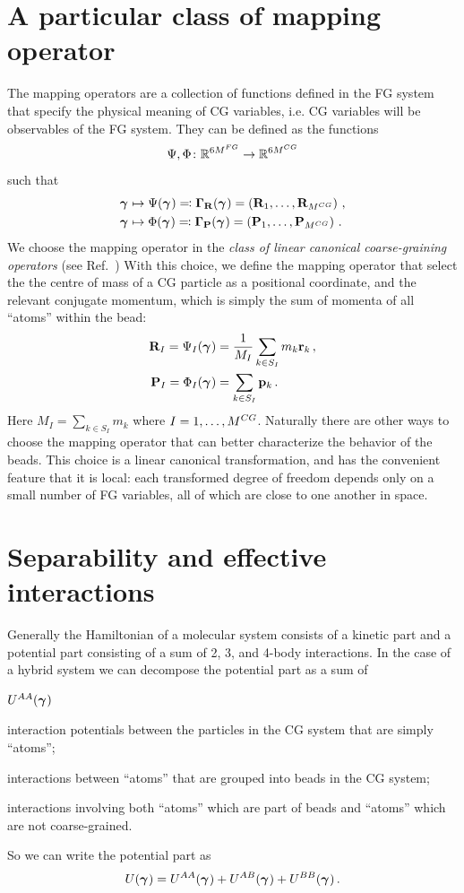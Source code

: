 \documentclass[10pt,a4paper]{book}
\theoremstyle{definition}
\begin{document}
\section{A particular class of mapping operator}
\label{Sec:Mapping}
The mapping operators are a collection of functions defined in the FG system that specify the physical meaning of CG variables, i.e. CG variables will be observables of the FG system. They can be defined as the functions
$$\Psi,\Phi\colon  \mathbb{R}^{6M^{FG}}  \to  \mathbb{R}^{6M^{CG}}$$ such that 
\begin{align*}
\boldsymbol\gamma_{}  &\mapsto \Psi(\boldsymbol\gamma_{}) \eqqcolon \boldsymbol\Gamma_{\mathbf{R}}(\boldsymbol\gamma_{})=\left(\mathbf{R}_1,\ldots,\mathbf{R}_{M^{CG}}\right)\,,\\
\boldsymbol\gamma_{}  &\mapsto \Phi(\boldsymbol\gamma_{}) \eqqcolon \boldsymbol\Gamma_{\mathbf{P}}(\boldsymbol\gamma_{})=\left(\mathbf{P}_1,\ldots,\mathbf{P}_{M^{CG}}\right)\,.
\end{align*}
We choose the mapping operator in the \emph{class of linear canonical coarse-graining operators} (see Ref.~\cite{DiPasquale2019}) With this choice, we define the mapping operator that select the the centre of mass of a CG particle as a positional coordinate, and the relevant conjugate momentum, which is simply the sum of momenta of all ``atoms'' within the bead:
\begin{align}
	\mathbf{R}_{I}=\Psi_{I} (\boldsymbol\gamma_{}) & = \frac{1}{M_I}\sum_{k\in S_I} m_k\mathbf{r}_k \,, \label{Eq:constr1} \\
    \mathbf{P}_{I}=\Phi_{I} (\boldsymbol\gamma_{}) & = \sum_{k\in S_I}{\mathbf{p}_k}\,. \label{Eq:constr2}
\end{align}
Here $ M_I=\sum_{k\in S_I}m_k $ where $ I = 1,\dots,M^{CG} $. Naturally there are other ways to choose the mapping operator that can better characterize the behavior of the beads. This choice is a linear canonical transformation, and has the convenient feature that it is local: each transformed degree of freedom depends only on a small number of FG variables, all of which are close to one another in space.

\section{Separability and effective interactions}
Generally the Hamiltonian of a molecular system consists of a kinetic part and a potential part consisting of a sum of 2, 3, and 4-body interactions. In the case of a hybrid system we can decompose the potential part as a sum of
%
\begin{labeling}{$\pot^{AA}(\Aphase{})$}
\item[$\pot^{AA}(\Aphase{})$] interaction potentials between the particles in the CG system that are simply ``atoms'';
\item[$\pot^{BB}(\Aphase{})$] interactions between ``atoms'' that are grouped into beads in the CG system;
\item[$\pot^{AB}(\Aphase{})$] interactions involving both ``atoms'' which are part of beads and ``atoms'' which are not coarse-grained.
\end{labeling}
%
So we can write the potential part as
\begin{equation}\label{Eq:int}
	U(\boldsymbol\gamma_{}) = U^{AA}(\boldsymbol\gamma_{}) + U^{AB}(\boldsymbol\gamma_{}) + U^{BB}(\boldsymbol\gamma_{})\,.
\end{equation}
\end{document}
